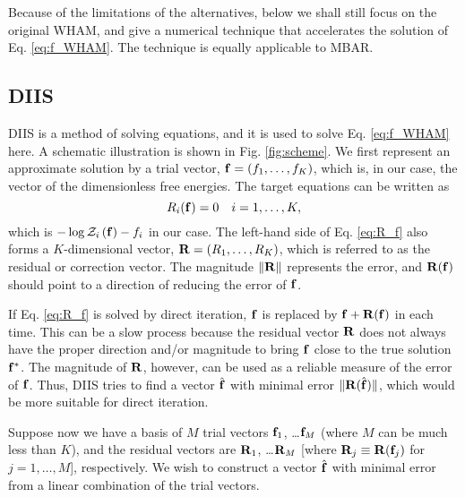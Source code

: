 \documentclass[reprint,aip,jcp,superscriptaddress]{revtex4-1}
\begin{document}
Because of the limitations of the alternatives,
below we shall still focus on the original WHAM,
and give a numerical technique
that accelerates the solution
of Eq. \eqref{eq:f_WHAM}.
%
The technique is equally applicable to MBAR.





\subsection{DIIS}



DIIS is a method of solving equations\cite{
pulay1980, *pulay1982, *hamilton1986,
kovalenko1999, howard2011},
and it is used
to solve Eq. \eqref{eq:f_WHAM} here.
%
A schematic illustration
is shown in Fig. \ref{fig:scheme}.
%
We first represent an approximate solution
by a trial vector,
$\mathbf{f} = (f_1, \dots, f_K)$,
which is, in our case, the vector of
the dimensionless free energies.
%
The target equations can be written as
%
\begin{equation}
  R_i(\mathbf{f}) = 0  \quad i = 1, \ldots, K,
  \label{eq:R_f}
\end{equation}
%
which is
$-\log \mathcal{Z}_i\left( \mathbf{f} \right) - f_i$
in our case.
%
The left-hand side of Eq. \eqref{eq:R_f}
also forms a $K$-dimensional vector,
$\mathbf{R} = (R_1, \dots, R_K)$,
which is referred to as the residual or correction vector.
%
The magnitude
$\| \mathbf{R} \|$
represents the error,
%
and
$\mathbf{R}(\mathbf{f})$
should point to a direction
of reducing the error of $\mathbf{f}$.
%



If Eq. \eqref{eq:R_f} is solved
by direct iteration,
$\mathbf{f}$ is replaced by $\mathbf{f} + \mathbf{R}(\mathbf{f})$
in each time.
%
This can be a slow process
because the residual vector $\mathbf{R}$
does not always have
the proper direction and/or magnitude
to bring $\mathbf{f}$
close to the true solution $\mathbf{f}^*$.
%
The magnitude of $\mathbf{R}$, however,
can be used as a reliable measure
of the error of $\mathbf{f}$.
%
Thus, DIIS tries to find a vector $\hat{\mathbf{f}}$
with minimal error $\| \mathbf{R}(\hat{\mathbf{f}}) \|$,
which would be more suitable
for direct iteration.



Suppose now we have a basis of $M$ trial vectors
$\mathbf{f}_1$, \dots $\mathbf{f}_M$
(where $M$ can be much less than $K$),
%
and the residual vectors are
$\mathbf{R}_1$, \dots $\mathbf{R}_M$
[where $\mathbf{R}_j \equiv \mathbf{R}(\mathbf{f}_j)$
for $j = 1, \dots, M$],
respectively.
%
We wish to construct a vector $\hat{\mathbf{f}}$
with minimal error
from a linear combination of the trial vectors.
\end{document}
